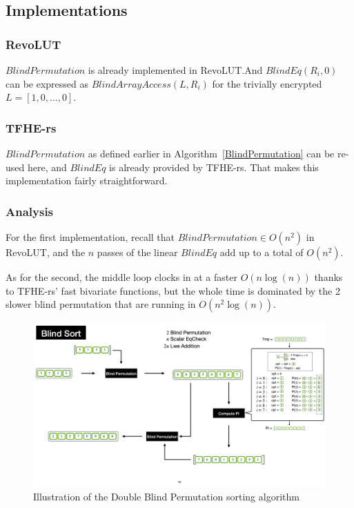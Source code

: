 \documentclass{article}
\begin{document}
\newpage

\subsection{Implementations}

\subsubsection*{RevoLUT}

$BlindPermutation$ is already implemented in RevoLUT.\@ And $BlindEq(R_i, 0)$ can be expressed as $BlindArrayAccess(L, R_i)$ for the trivially encrypted $L = [1, 0, \dots, 0]$.

\subsubsection*{TFHE-rs}

$BlindPermutation$ as defined earlier in Algorithm~\ref{BlindPermutation} can be re-used here, and $BlindEq$ is already provided by TFHE-rs. That makes this implementation fairly straightforward.

\subsubsection*{Analysis}

For the first implementation, recall that $BlindPermutation \in O(n^2)$ in RevoLUT, and the $n$ passes of the linear $BlindEq$ add up to a total of $O(n^2)$.

As for the second, the middle loop clocks in at a faster $O(n\log(n))$ thanks to TFHE-rs' fast bivariate functions, but the whole time is dominated by the 2 slower blind permutation that are running in $O(n^2\log(n))$.

\begin{figure}[h]
    \centering
    \includegraphics[scale=0.1]{2bp}
    \caption{Illustration of the Double Blind Permutation sorting algorithm}
\end{figure}
\end{document}
